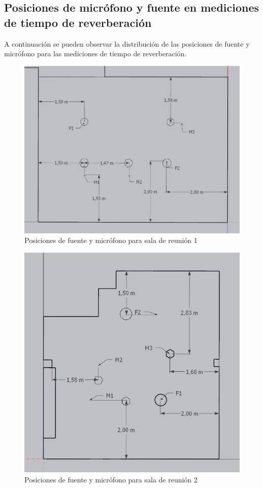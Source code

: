 \subsection{Posiciones de micrófono y fuente en mediciones de tiempo de reverberación} \label{subsec: posiciones RT}
A continuación se pueden observar la distribución de las posiciones de fuente y micrófono para las mediciones de tiempo de reverberación.
\begin{figure}[H]
    \centering
    \includegraphics[scale=0.4]{Imagenes/PosicionesRT/Posiciones Sala 1.png}
    \caption{Posiciones de fuente y micrófono para sala de reunión 1}
    \label{fig: posiciones sala1}
\end{figure}

\begin{figure}[H]
    \centering
    \includegraphics[scale=0.4]{Imagenes/PosicionesRT/Posiciones Sala 2.png}
    \caption{Posiciones de fuente y micrófono para sala de reunión 2}
    \label{fig: posiciones sala2}
\end{figure}

